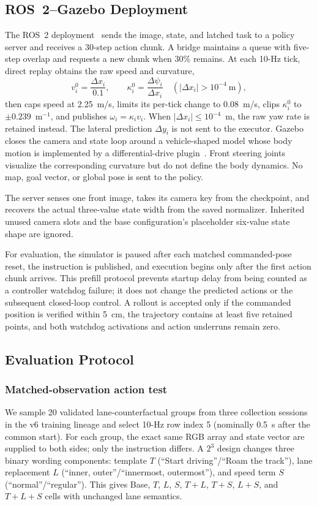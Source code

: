 \documentclass[letterpaper,conference]{IEEEtran}
\begin{document}
\subsection{ROS~2--Gazebo Deployment}
The ROS~2 deployment~\cite{ros2} sends the image, state, and latched task to a
policy server and receives a 30-step action chunk. A bridge maintains a queue
with five-step overlap and requests a new chunk when 30\% remains. At each
10-Hz tick, direct replay obtains the raw speed and curvature,
\begin{equation}
v_i^{0}=\frac{\Delta x_i}{0.1},\qquad
\kappa_i^{0}=\frac{\Delta\psi_i}{\Delta x_i}\quad(|\Delta x_i|>10^{-4}\ \mathrm{m}),
\label{eq:replay}
\end{equation}
then caps speed at 2.25~m/s, limits its per-tick change to 0.08~m/s, clips
$\kappa_i^0$ to $\pm0.239$~m$^{-1}$, and publishes
$\omega_i=\kappa_i v_i$. When $|\Delta x_i|\le10^{-4}$~m, the raw yaw rate is
retained instead. The lateral prediction $\Delta y_i$ is not sent to the
executor. Gazebo closes the camera and state loop around a vehicle-shaped model
whose body motion is implemented by a differential-drive plugin~\cite{gazebo}.
Front steering joints visualize the corresponding curvature but do not define
the body dynamics. No map, goal vector, or global pose is sent to the policy.

The server senses one front image, takes its camera key from the checkpoint,
and recovers the actual three-value state width from the saved normalizer.
Inherited unused camera slots and the base configuration's placeholder
six-value state shape are ignored.

For evaluation, the simulator is paused after each matched commanded-pose
reset, the instruction is published, and execution begins only after the first action
chunk arrives. This prefill protocol prevents startup delay from being counted
as a controller watchdog failure; it does not change the predicted actions or
the subsequent closed-loop control. A rollout is accepted only if the
commanded position is verified within 5~cm, the trajectory contains at least
five retained points, and both watchdog activations and action underruns remain
zero.

\subsection{Evaluation Protocol}
\subsubsection{Matched-observation action test}
We sample 20 validated lane-counterfactual groups from three collection
sessions in the v6 training lineage and select 10-Hz row index 5 (nominally
0.5~s after the common start). For each group, the exact same RGB array and state vector are supplied
to both sides; only the instruction differs. A $2^3$ design changes three
binary wording components: template $T$ (``Start driving''/``Roam the track''),
lane replacement $L$ (``inner, outer''/``innermost, outermost''), and speed term $S$
(``normal''/``regular''). This gives Base, $T$, $L$, $S$, $T{+}L$, $T{+}S$,
$L{+}S$, and $T{+}L{+}S$ cells with unchanged lane semantics.
\end{document}

